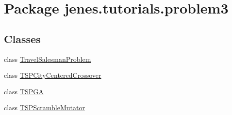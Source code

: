 \hypertarget{namespacejenes_1_1tutorials_1_1problem3}{\section{Package jenes.\-tutorials.\-problem3}
\label{namespacejenes_1_1tutorials_1_1problem3}
}
\subsection*{Classes}
\begin{DoxyCompactItemize}
\item 
class \hyperlink{classjenes_1_1tutorials_1_1problem3_1_1_travel_salesman_problem}{Travel\-Salesman\-Problem}
\item 
class \hyperlink{classjenes_1_1tutorials_1_1problem3_1_1_t_s_p_city_centered_crossover}{T\-S\-P\-City\-Centered\-Crossover}
\item 
class \hyperlink{classjenes_1_1tutorials_1_1problem3_1_1_t_s_p_g_a}{T\-S\-P\-G\-A}
\item 
class \hyperlink{classjenes_1_1tutorials_1_1problem3_1_1_t_s_p_scramble_mutator}{T\-S\-P\-Scramble\-Mutator}
\end{DoxyCompactItemize}

